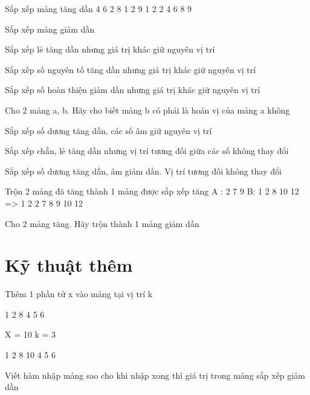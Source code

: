 \begin{problem}
    Sắp xếp mảng tăng dần 4 6 2 8 1 2 9 1 2 2 4 6 8 9
\end{problem}
\begin{problem}
    Sắp xếp mảng giảm dần
\end{problem}
\begin{problem}
    Sắp xếp lẻ tăng dần nhưng giá trị khác giữ nguyên vị trí
\end{problem}
\begin{problem}
    Sắp xếp số nguyên tố tăng dần nhưng giá trị khác giữ nguyên vị trí
\end{problem}
\begin{problem}
    Sắp xếp số hoàn thiện giảm dần nhưng giá trị khác giữ nguyên vị trí
\end{problem}
\begin{problem}
    Cho 2 mảng a, b. Hãy cho biết mảng b có phải là hoán vị của mảng a không
\end{problem}
\begin{problem}
    Sắp xếp số dương tăng dần, các số âm giữ nguyên vị trí
\end{problem}
\begin{problem}
    Sắp xếp chẵn, lẻ tăng dần nhưng vị trí tương đối giữa các số không thay đổi
\end{problem}
\begin{problem}
    Sắp xếp số dương tăng dần, âm giảm dần. Vị trí tương đối không thay đổi
\end{problem}
\begin{problem}
    Trộn 2 mảng đã tăng thành 1 mảng được sắp xếp tăng A : 2 7 9 B: 1 2 8 10 12 => 1 2 2 7 8 9 10 12
\end{problem}
\begin{problem}
    Cho 2 mảng tăng. Hãy trộn thành 1 mảng giảm dần
\end{problem}

\section{Kỹ thuật thêm}

\begin{problem}
    Thêm 1 phần tử x vào mảng tại vị trí k
    
    1 2 8 4 5 6
    
    X = 10  k = 3
    
    1 2 8 10 4 5 6
\end{problem}

\begin{problem}
    Viết hàm nhập mảng sao cho khi nhập xong thì giá trị trong mảng sắp xếp giảm dần
\end{problem}

